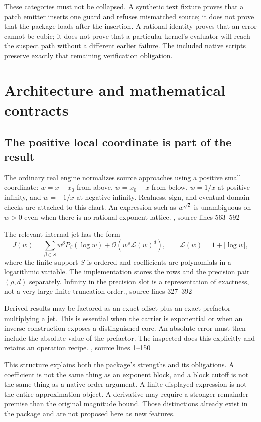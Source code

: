 \documentclass[11pt,letterpaper]{article}
\newcommand{\OO}{\mathcal{O}}
\newcommand{\LL}{\mathcal{L}}
\newcommand{\src}[2]{\cite{#1}, source lines #2}
\theoremstyle{definition}\newtheorem{definition}[proposition]{Definition}
\begin{document}
These categories must not be collapsed. A synthetic text fixture proves that a
patch emitter inserts one guard and refuses mismatched source; it does not prove
that the package loads after the insertion. A rational identity proves that an
error cannot be cubic; it does not prove that a particular kernel's evaluator
will reach the suspect path without a different earlier failure. The included
native scripts preserve exactly that remaining verification obligation.

\section{Architecture and mathematical contracts}
\subsection{The positive local coordinate is part of the result}
The ordinary real engine normalizes source approaches using a positive small
coordinate: $w=x-x_0$ from above, $w=x_0-x$ from below, $w=1/x$ at positive
infinity, and $w=-1/x$ at negative infinity. Realness, sign, and eventual-domain
checks are attached to this chart. An expression such as $w^{\sqrt 2}$ is
unambiguous on $w>0$ even when there is no rational exponent lattice.
\src{core}{563--592}

The relevant internal jet has the form
\begin{equation}\label{eq:jet}
 J(w)=\sum_{\beta\in S}w^\beta P_\beta(\log w)
       +\OO\!\left(w^\rho\LL(w)^d\right),
 \qquad \LL(w)=1+|\log w|,
\end{equation}
where the finite support $S$ is ordered and coefficients are polynomials in a
logarithmic variable. The implementation stores the rows and the precision
pair $(\rho,d)$ separately. Infinity in the precision slot is a representation
of exactness, not a very large finite truncation order.\src{core}{327--392}

Derived results may be factored as an exact offset plus an exact prefactor
multiplying a jet. This is essential when the carrier is exponential or when
an inverse construction exposes a distinguished core. An absolute error must
then include the absolute value of the prefactor. The inspected
 does this explicitly and retains an operation recipe.
\src{operations}{1--150}

This structure explains both the package's strengths and its obligations.
A coefficient is not the same thing as an exponent block, and a block cutoff is
not the same thing as a native order argument. A finite displayed expression
is not the entire approximation object. A derivative may require a stronger
remainder premise than the original magnitude bound. Those distinctions
already exist in the package and are not proposed here as new features.
\cite{operations,contracts}
\end{document}
